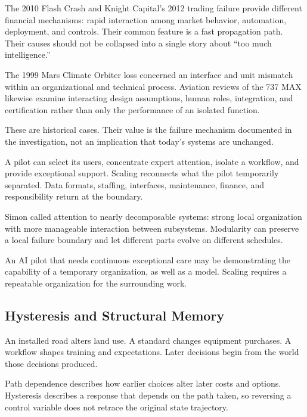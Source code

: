 The 2010 Flash Crash and Knight Capital's 2012 trading failure provide different financial mechanisms: rapid interaction among market behavior, automation, deployment, and controls.\cite{sec2010findings,sec2013knight} Their common feature is a fast propagation path. Their causes should not be collapsed into a single story about “too much intelligence.”

The 1999 Mars Climate Orbiter loss concerned an interface and unit mismatch within an organizational and technical process.\cite{nasa1999mishap} Aviation reviews of the 737 MAX likewise examine interacting design assumptions, human roles, integration, and certification rather than only the performance of an isolated function.\cite{jatr2019boeing}

These are historical cases. Their value is the failure mechanism documented in the investigation, not an implication that today's systems are unchanged.


A pilot can select its users, concentrate expert attention, isolate a workflow, and provide exceptional support. Scaling reconnects what the pilot temporarily separated. Data formats, staffing, interfaces, maintenance, finance, and responsibility return at the boundary.

Simon called attention to nearly decomposable systems: strong local organization with more manageable interaction between subsystems.\cite{simon1962} Modularity can preserve a local failure boundary and let different parts evolve on different schedules.\cite{baldwin2000design}

An AI pilot that needs continuous exceptional care may be demonstrating the capability of a temporary organization, as well as a model. Scaling requires a repeatable organization for the surrounding work.

\subsection{Hysteresis and Structural Memory}


An installed road alters land use. A standard changes equipment purchases. A workflow shapes training and expectations. Later decisions begin from the world those decisions produced.

Path dependence describes how earlier choices alter later costs and options.\cite{david1985clio} Hysteresis describes a response that depends on the path taken, so reversing a control variable does not retrace the original state trajectory.

